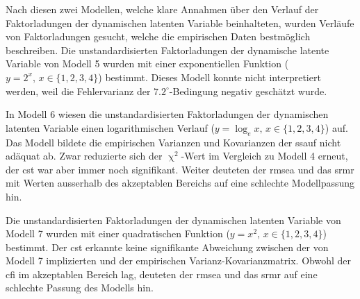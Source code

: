 \documentclass[11pt, twoside, a4paper]{book}		%
\begin{document}
Nach diesen zwei Modellen, welche klare Annahmen über den Verlauf der Faktorladungen der dynamischen latenten Variable beinhalteten, wurden Verläufe von Faktorladungen gesucht, welche die empirischen Daten bestmöglich beschreiben. 
Die unstandardisierten Faktorladungen der dynamische latente Variable von Modell 5 wurden mit einer exponentiellen Funktion ($y=2^x,\,x\in\{1, 2, 3, 4\}$) bestimmt. Dieses Modell konnte nicht interpretiert werden, weil die Fehlervarianz der $7.2^{\circ}$-Bedingung negativ geschätzt wurde. 

In Modell 6 wiesen die unstandardisierten Faktorladungen der dynamischen latenten Variable einen logarithmischen Verlauf ($y=\log_{e}x,\,x\in\{1, 2, 3, 4\}$) auf. Das Modell bildete die empirischen Varianzen und Kovarianzen der \gls{ssauf} nicht adäquat ab. Zwar reduzierte sich der $\upchi^2$-Wert im Vergleich zu Modell 4 erneut, der \gls{cst} war aber immer noch signifikant. Weiter deuteten der \gls{rmsea} und das \gls{srmr} mit Werten ausserhalb des akzeptablen Bereichs auf eine schlechte Modellpassung hin.

Die unstandardisierten Faktorladungen der dynamischen latenten Variable von Modell 7 wurden mit einer quadratischen Funktion ($y=x^2,\,x\in\{1, 2, 3, 4\}$) bestimmt. Der \gls{cst} erkannte keine signifikante Abweichung zwischen der von Modell 7 implizierten und der empirischen Var\-ianz-Ko\-var\-ianz\-ma\-trix. Obwohl der \gls{cfi} im akzeptablen Bereich lag, deuteten der \gls{rmsea} und das \gls{srmr} auf eine schlechte Passung des Modells hin.
\end{document}
